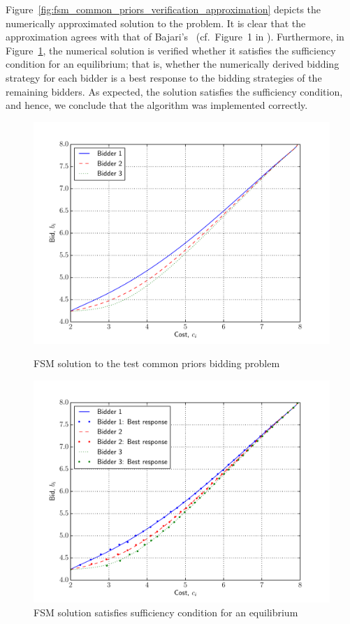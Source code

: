 Figure~\ref{fig:fsm_common_priors_verification_approximation} depicts the numerically approximated solution to the problem. It is clear that the approximation agrees with that of Bajari's~\cite{Bajari2001a} (cf.~Figure~1 in \cite{Bajari2001a}). Furthermore, in Figure~\ref{fig:fsm_common_priors_verification_sufficiency_approximation}, the numerical solution is verified whether it satisfies the sufficiency condition for an equilibrium; that is, whether the numerically derived bidding strategy for each bidder is a best response to the bidding strategies of the remaining bidders. As expected, the solution satisfies the sufficiency condition, and hence, we conclude that the algorithm was implemented correctly.

\begin{figure}[p!]
  \includegraphics[width=\figsize]{Approximation/Figures/fsm_common_priors_verification}
  \caption{FSM solution to the test common priors bidding problem}
  \label{fig:fsm_common_priors_verification_approximation}
  \vspace{10mm}
  \includegraphics[width=\figsize]{Approximation/Figures/fsm_common_priors_verification_sufficiency}
  \caption{FSM solution satisfies sufficiency condition for an equilibrium}
  \label{fig:fsm_common_priors_verification_sufficiency_approximation}
\end{figure}

